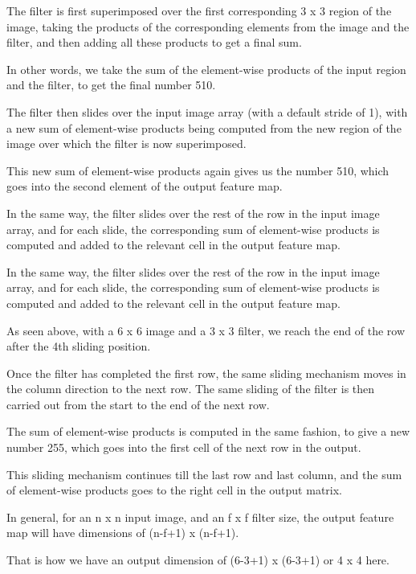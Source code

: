 	\begin{numberedlist}
		\item The filter is first superimposed over the first corresponding 3 x 3 region of the image, taking the products of the corresponding elements from the image and the filter, and then adding all these products to get a final sum.
		\item In other words, we take the sum of the element-wise products of the input region and the filter, to get the final number 510.
		\item The filter then slides over the input image array (with a default stride of 1), with a new sum of element-wise products being computed from the new region of the image over which the filter is now superimposed.
		\item This new sum of element-wise products again gives us the number 510, which goes into the second element of the output feature map.
		\item In the same way, the filter slides over the rest of the row in the input image array, and for each slide, the corresponding sum of element-wise products is computed and added to the relevant cell in the output feature map.
		\item In the same way, the filter slides over the rest of the row in the input image array, and for each slide, the corresponding sum of element-wise products is computed and added to the relevant cell in the output feature map.
		\item As seen above, with a 6 x 6 image and a 3 x 3 filter, we reach the end of the row after the 4th sliding position.
		\item Once the filter has completed the first row, the same sliding mechanism moves in the column direction to the next row. The same sliding of the filter is then carried out from the start to the end of the next row.
		\item The sum of element-wise products is computed in the same fashion, to give a new number 255, which goes into the first cell of the next row in the output.
		\item This sliding mechanism continues till the last row and last column, and the sum of element-wise products goes to the right cell in the output matrix.
		\item In general, for an n x n input image, and an f x f filter size, the output feature map will have dimensions of (n-f+1) x (n-f+1).
		\item That is how we have an output dimension of (6-3+1) x (6-3+1) or 4 x 4 here.
	\end{numberedlist}

